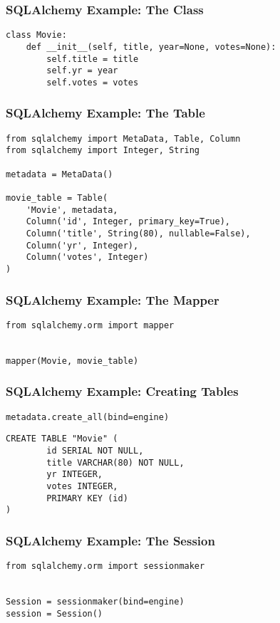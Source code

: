 \documentclass[dvipsnames]{beamer}
\theoremstyle{plain}
\begin{document}
\begin{frame}[fragile]
  \frametitle{SQLAlchemy Example: The Class}

  \begin{lstlisting}
class Movie:
    def __init__(self, title, year=None, votes=None):
        self.title = title
        self.yr = year
        self.votes = votes
  \end{lstlisting}
\end{frame}

\begin{frame}[fragile]
  \frametitle{SQLAlchemy Example: The Table}

  \begin{lstlisting}
from sqlalchemy import MetaData, Table, Column
from sqlalchemy import Integer, String

metadata = MetaData()

movie_table = Table(
    'Movie', metadata,
    Column('id', Integer, primary_key=True),
    Column('title', String(80), nullable=False),
    Column('yr', Integer),
    Column('votes', Integer)
)
  \end{lstlisting}
\end{frame}

\begin{frame}[fragile]
  \frametitle{SQLAlchemy Example: The Mapper}

  \begin{lstlisting}
from sqlalchemy.orm import mapper


mapper(Movie, movie_table)
  \end{lstlisting}
\end{frame}

\begin{frame}[fragile]
  \frametitle{SQLAlchemy Example: Creating Tables}

  \begin{lstlisting}
metadata.create_all(bind=engine)
  \end{lstlisting}

  \begin{lstlisting}[language=FullSQL]
CREATE TABLE "Movie" (
        id SERIAL NOT NULL,
        title VARCHAR(80) NOT NULL,
        yr INTEGER,
        votes INTEGER,
        PRIMARY KEY (id)
)
  \end{lstlisting}
\end{frame}

\begin{frame}[fragile]
  \frametitle{SQLAlchemy Example: The Session}

  \begin{lstlisting}
from sqlalchemy.orm import sessionmaker


Session = sessionmaker(bind=engine)
session = Session()
  \end{lstlisting}
\end{frame}
\end{document}
